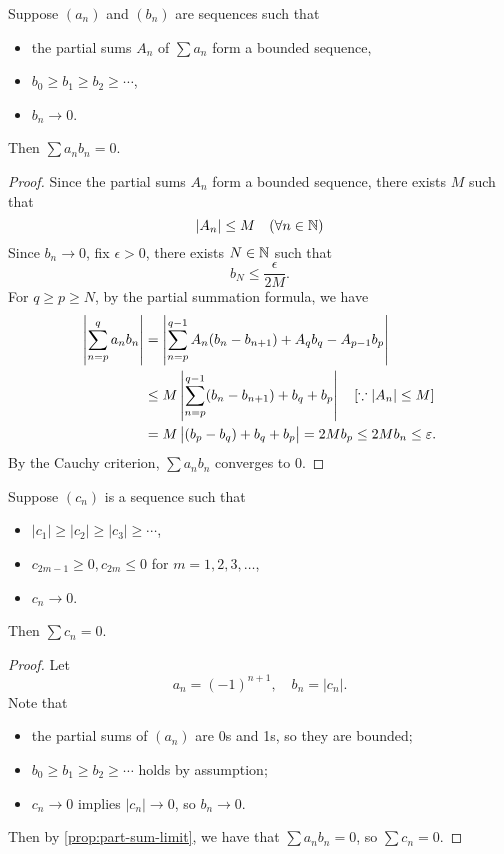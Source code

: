 \begin{proposition}\label{prop:part-sum-limit}
Suppose $(a_n)$ and $(b_n)$ are sequences such that
\begin{itemize}
\item the partial sums $A_n$ of $\sum a_n$ form a bounded sequence,
\item $b_0\ge b_1\ge b_2\ge\cdots$,
\item $b_n\to0$.
\end{itemize}
Then $\sum a_nb_n=0$.
\end{proposition}

\begin{proof}
Since the partial sums $A_n$ form a bounded sequence, there exists $M$ such that
\[|A_n|\le M\quad(\forall n\in\mathbb N)\]
Since $b_n\to0$, fix $\epsilon>0$, there exists $N\in\mathbb N$ such that
\[b_N\le\frac{\epsilon}{2M}.\]
For $q\ge p\ge N$, by the partial summation formula, we have
\begin{align*}
\left|\sum_{n=p}^{q}a_nb_n\right|
&=\left|\sum_{n=p}^{q-1}A_n(b_n-b_{n+1})+A_qb_q-A_{p-1}b_p\right|\\
&\le M\left|\sum_{n=p}^{q-1}(b_n-b_{n+1})+b_q+b_p\right|\quad[\because |A_n|\le M]\\
&=M\left|(b_p-b_q)+b_q+b_p\right|=2Mb_p\le 2Mb_n\le\varepsilon.
\end{align*}
By the Cauchy criterion, $\sum a_nb_n$ converges to $0$.
\end{proof}

\begin{corollary}
Suppose $(c_n)$ is a sequence such that
\begin{itemize}
\item $|c_1|\ge|c_2|\ge|c_3|\ge\cdots$,
\item $c_{2m-1}\ge0,c_{2m}\le0$ for $m=1,2,3,\dots$,
\item $c_n\to0$.
\end{itemize}
Then $\sum c_n=0$.
\end{corollary}

\begin{proof}
Let
\[a_n=(-1)^{n+1},\quad b_n=|c_n|.\]
Note that
\begin{itemize}
\item the partial sums of $(a_n)$ are 0s and 1s, so they are bounded;
\item $b_0\ge b_1\ge b_2\ge\cdots$ holds by assumption;
\item $c_n\to0$ implies $|c_n|\to0$, so $b_n\to0$.
\end{itemize}
Then by \cref{prop:part-sum-limit}, we have that $\sum a_nb_n=0$, so $\sum c_n=0$.
\end{proof}
\pagebreak


